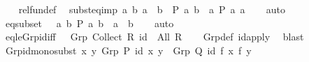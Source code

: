 \begin{isabellebody}
%
\isadelimproof
\ \ %
\endisadelimproof
%
\isatagproof
{}\isamarkupfalse%
\ rel{\isacharunderscore}{\kern0pt}fun{\isacharunderscore}{\kern0pt}def\ \isacommand{{\isachardot}{\kern0pt}{\isachardot}{\kern0pt}}\isamarkupfalse%
%
\endisatagproof
{\isafoldproof}%
%
\isadelimproof
\isanewline
%
\endisadelimproof
\isanewline
{}\isamarkupfalse%
\ subst{\isacharunderscore}{\kern0pt}eq{\isacharunderscore}{\kern0pt}imp{\isacharcolon}{\kern0pt}\ {\isachardoublequoteopen}{\isacharparenleft}{\kern0pt}{\isasymforall}a\ b{\isachardot}{\kern0pt}\ a\ {\isacharequal}{\kern0pt}\ b\ {\isasymlongrightarrow}\ P\ a\ b{\isacharparenright}{\kern0pt}\ {\isasymequiv}\ {\isacharparenleft}{\kern0pt}{\isasymforall}a{\isachardot}{\kern0pt}\ P\ a\ a{\isacharparenright}{\kern0pt}{\isachardoublequoteclose}\isanewline
%
\isadelimproof
\ \ %
\endisadelimproof
%
\isatagproof
{}\isamarkupfalse%
\ auto%
\endisatagproof
{\isafoldproof}%
%
\isadelimproof
\isanewline
%
\endisadelimproof
\isanewline
{}\isamarkupfalse%
\ eq{\isacharunderscore}{\kern0pt}subset{\isacharcolon}{\kern0pt}\ {\isachardoublequoteopen}{\isacharparenleft}{\kern0pt}{\isacharequal}{\kern0pt}{\isacharparenright}{\kern0pt}\ {\isasymle}\ {\isacharparenleft}{\kern0pt}{\isasymlambda}a\ b{\isachardot}{\kern0pt}\ P\ a\ b\ {\isasymor}\ a\ {\isacharequal}{\kern0pt}\ b{\isacharparenright}{\kern0pt}{\isachardoublequoteclose}\isanewline
%
\isadelimproof
\ \ %
\endisadelimproof
%
\isatagproof
{}\isamarkupfalse%
\ auto%
\endisatagproof
{\isafoldproof}%
%
\isadelimproof
\isanewline
%
\endisadelimproof
\isanewline
{}\isamarkupfalse%
\ eq{\isacharunderscore}{\kern0pt}le{\isacharunderscore}{\kern0pt}Grp{\isacharunderscore}{\kern0pt}id{\isacharunderscore}{\kern0pt}iff{\isacharcolon}{\kern0pt}\ {\isachardoublequoteopen}{\isacharparenleft}{\kern0pt}{\isacharparenleft}{\kern0pt}{\isacharequal}{\kern0pt}{\isacharparenright}{\kern0pt}\ {\isasymle}\ Grp\ {\isacharparenleft}{\kern0pt}Collect\ R{\isacharparenright}{\kern0pt}\ id{\isacharparenright}{\kern0pt}\ {\isacharequal}{\kern0pt}\ {\isacharparenleft}{\kern0pt}All\ R{\isacharparenright}{\kern0pt}{\isachardoublequoteclose}\isanewline
%
\isadelimproof
\ \ %
\endisadelimproof
%
\isatagproof
{}\isamarkupfalse%
\ Grp{\isacharunderscore}{\kern0pt}def\ id{\isacharunderscore}{\kern0pt}apply\ \isamarkupfalse%
\ blast%
\endisatagproof
{\isafoldproof}%
%
\isadelimproof
\isanewline
%
\endisadelimproof
\isanewline
{}\isamarkupfalse%
\ Grp{\isacharunderscore}{\kern0pt}id{\isacharunderscore}{\kern0pt}mono{\isacharunderscore}{\kern0pt}subst{\isacharcolon}{\kern0pt}\ {\isachardoublequoteopen}{\isacharparenleft}{\kern0pt}{\isasymAnd}x\ y{\isachardot}{\kern0pt}\ Grp\ P\ id\ x\ y\ {\isasymLongrightarrow}\ Grp\ Q\ id\ {\isacharparenleft}{\kern0pt}f\ x{\isacharparenright}{\kern0pt}\ {\isacharparenleft}{\kern0pt}f\ y{\isacharparenright}{\kern0pt}{\isacharparenright}{\kern0pt}\ {\isasymequiv}\isanewline

\end{isabellebody}
